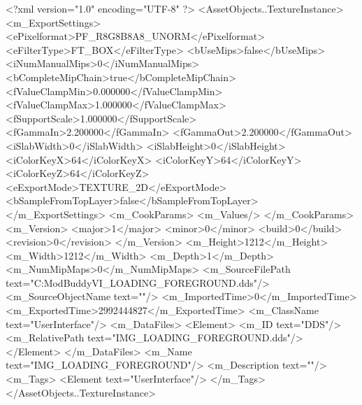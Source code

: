 <?xml version="1.0" encoding="UTF-8" ?>
<AssetObjects..TextureInstance>
	<m_ExportSettings>
		<ePixelformat>PF_R8G8B8A8_UNORM</ePixelformat>
		<eFilterType>FT_BOX</eFilterType>
		<bUseMips>false</bUseMips>
		<iNumManualMips>0</iNumManualMips>
		<bCompleteMipChain>true</bCompleteMipChain>
		<fValueClampMin>0.000000</fValueClampMin>
		<fValueClampMax>1.000000</fValueClampMax>
		<fSupportScale>1.000000</fSupportScale>
		<fGammaIn>2.200000</fGammaIn>
		<fGammaOut>2.200000</fGammaOut>
		<iSlabWidth>0</iSlabWidth>
		<iSlabHeight>0</iSlabHeight>
		<iColorKeyX>64</iColorKeyX>
		<iColorKeyY>64</iColorKeyY>
		<iColorKeyZ>64</iColorKeyZ>
		<eExportMode>TEXTURE_2D</eExportMode>
		<bSampleFromTopLayer>false</bSampleFromTopLayer>
	</m_ExportSettings>
	<m_CookParams>
		<m_Values/>
	</m_CookParams>
	<m_Version>
		<major>1</major>
		<minor>0</minor>
		<build>0</build>
		<revision>0</revision>
	</m_Version>
	<m_Height>1212</m_Height>
	<m_Width>1212</m_Width>
	<m_Depth>1</m_Depth>
	<m_NumMipMaps>0</m_NumMipMaps>
	<m_SourceFilePath text="C:\Users\asus\Documents\Firaxis ModBuddy\Civilization VI\temppic\IMG_LOADING_FOREGROUND.dds"/>
	<m_SourceObjectName text=""/>
	<m_ImportedTime>0</m_ImportedTime>
	<m_ExportedTime>2992444827</m_ExportedTime>
	<m_ClassName text="UserInterface"/>
	<m_DataFiles>
		<Element>
			<m_ID text="DDS"/>
			<m_RelativePath text="IMG_LOADING_FOREGROUND.dds"/>
		</Element>
	</m_DataFiles>
	<m_Name text="IMG_LOADING_FOREGROUND"/>
	<m_Description text=""/>
	<m_Tags>
		<Element text="UserInterface"/>
	</m_Tags>
</AssetObjects..TextureInstance>

